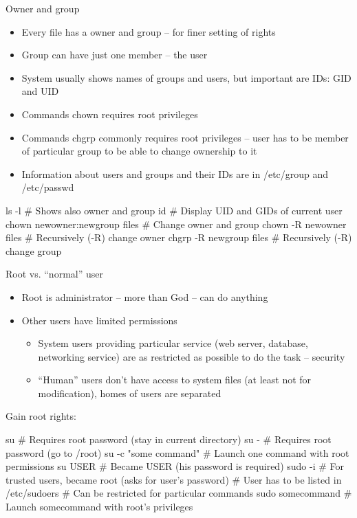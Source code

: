 \documentclass[compress, ucs, xelatex, 11pt, xcolor=svgnames,
  hyperref={
    bookmarks=true,
    unicode=true,
    colorlinks=true,
    pdftitle={Linux, command line and MetaCentrum},
    plainpages=false,
    pdfauthor={Vojtech Zeisek},
    pdfsubject={Course about use of Linux command line, writing shell scripts and using MetaCentrum of CESNET},
    pdfcreator={XeLaTeX},
    pdfkeywords={Linux, GNU, BASH, shell, command line, MetaCentrum},
    linkcolor=Red,
    anchorcolor=Blue,
    citecolor=Purple,
    filecolor=DodgerBlue,
    menucolor=DarkOrchid,
    urlcolor=DeepSkyBlue,
    pdftex},
  url={hyphens, lowtilde} %
  ]{beamer}
\begin{document}
\begin{frame}[fragile]{Owner and group}
\begin{itemize}
  \item Every file has a owner and group -- for finer setting of rights
  \item Group can have just one member -- the user
  \item System usually shows names of groups and users, but important are IDs: GID and UID
  \item Commands chown requires root privileges
  \item Commands chgrp commonly requires root privileges -- user has to be member of particular group to be able to change ownership to it
  \item Information about users and groups and their IDs are in /etc/group and /etc/passwd
\end{itemize}
  \begin{bashcode}
    ls -l # Shows also owner and group
    id # Display UID and GIDs of current user
    chown newowner:newgroup files # Change owner and group
    chown -R newowner files # Recursively (-R) change owner
    chgrp -R newgroup files # Recursively (-R) change group
  \end{bashcode}
\end{frame}

\begin{frame}[fragile]{Root vs. ``normal'' user}
\begin{itemize}
  \item Root is administrator -- more than God -- can do anything
  \item Other users have limited permissions
  \begin{itemize}
    \item System users providing particular service (web server, database, networking service) are as restricted as possible to do the task -- security
    \item ``Human'' users don't have access to system files (at least not for modification), homes of users are separated
  \end{itemize}
\end{itemize}
Gain root rights:
  \begin{bashcode}
    su # Requires root password (stay in current directory)
    su - # Requires root password (go to /root)
    su -c "some command" # Launch one command with root permissions
    su USER # Became USER (his password is required)
    sudo -i # For trusted users, became root (asks for user's password)
            # User has to be listed in /etc/sudoers
            # Can be restricted for particular commands
    sudo somecommand # Launch somecommand with root's privileges
  \end{bashcode}
\end{frame}
\end{document}
